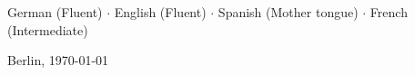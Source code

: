 \documentclass[a4paper,12pt,usenames,dvipsnames]{scrartcl}
\newcommand\VRule{\color{lightGray}\vrule width 0.25pt}
\newcommand{\preSectionSpace}{\vspace{3.2pt}}
\newcommand{\afterSectionSpace}{\vspace{2.3pt}}
\newcommand{\horizontalSpaceBeforeSection}{\hspace{0.1cm}}
\newcommand{\fromBis}[2]{\scriptsize #1 -- #2}
\newcommand{\cvSection}[1]{\preSectionSpace{\large\textcolor{black}{#1}}\afterSectionSpace}
\newcommand{\cvDate}[1]{\scriptsize #1}
\newcommand{\cvSkill}[1]{\footnotesize #1}
\begin{document}
	\cvSection{Languages}
    
    \begin{minipage}{1.0\textwidth}
      \begin{flushleft}
        \cvSkill{German (Fluent)} \quad $\cdot$ \quad
        \cvSkill{English (Fluent)} \quad $\cdot$ \quad
        \cvSkill{Spanish (Mother tongue)} \quad $\cdot$ \quad
        \cvSkill{French (Intermediate)}
      \end{flushleft}
    \end{minipage}

    \vspace{0pt}
    \noindent\hfill{\footnotesize Berlin, \today}
	
\end{document}
